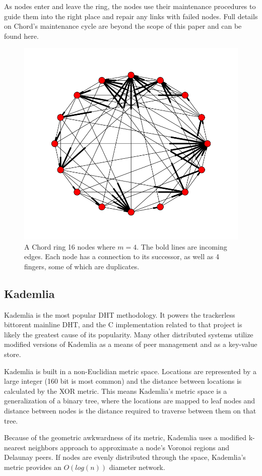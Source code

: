 As nodes enter and leave the ring, the nodes use their maintenance procedures to guide them into the right place and repair any links with failed nodes.  Full details on Chord's maintenance cycle are beyond the scope of this paper and can be found here\cite{chord}.

\begin{figure}
	\includegraphics[width=0.5\linewidth]{chordreal}
	\caption{A Chord ring 16 nodes where $m=4$.  The bold lines are incoming edges.  Each node has a connection to its successor, as well as 4 fingers, some of which are duplicates.}
	\label{chordreal}
\end{figure}


\subsection{Kademlia}

Kademlia is the most popular DHT methodology. 
It powers the trackerless bittorent mainline DHT, and the C implementation related to that project is likely the greatest cause of its popularity.
Many other distributed systems utilize modified versions of Kademlia as a means of peer management and as a key-value store.

Kademlia is built in a non-Euclidian metric space. 
Locations are represented by a large integer (160 bit is most common) and the distance between locations is calculated by the XOR metric.
This means Kademlia's metric space is a generalization of a binary tree, where the locations are mapped to leaf nodes and distance between nodes is the distance required to traverse between them on that tree.

Because of the geometric awkwardness of its metric, Kademlia uses a modified k-nearest neighbors approach to approximate a node's Voronoi regions and Delaunay peers.
If nodes are evenly distributed through the space, Kademlia's metric provides an $O(log(n))$ diameter network.


